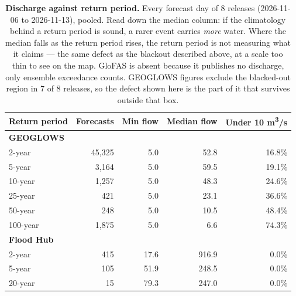 \begin{table}[htbp]
\centering
\small
\begin{tabular}{l r r r r}
\toprule
Return period & Forecasts & Min flow & Median flow & Under 10 m\textsuperscript{3}/s \\
\midrule
\multicolumn{5}{l}{\textbf{GEOGLOWS}} \\
  2-year & 45,325 & 5.0 & 52.8 & 16.8\% \\
  5-year & 3,164 & 5.0 & 59.5 & 19.1\% \\
  10-year & 1,257 & 5.0 & 48.3 & 24.6\% \\
  25-year & 421 & 5.0 & 23.1 & 36.6\% \\
  50-year & 248 & 5.0 & 10.5 & 48.4\% \\
  100-year & 1,875 & 5.0 & 6.6 & 74.3\% \\
\midrule
\multicolumn{5}{l}{\textbf{Flood Hub}} \\
  2-year & 415 & 17.6 & 916.9 & 0.0\% \\
  5-year & 105 & 51.9 & 248.5 & 0.0\% \\
  20-year & 15 & 79.3 & 247.0 & 0.0\% \\
\bottomrule
\end{tabular}
\caption[Discharge against return period]{%
  \textbf{Discharge against return period.}
  Every forecast day of 8 releases (2026-11-06 to
  2026-11-13), pooled. Read down the median column: if the climatology
  behind a return period is sound, a rarer event carries \emph{more} water.
  Where the median falls as the return period rises, the return period is not
  measuring what it claims --- the same defect as the blackout described above,
  at a scale too thin to see on the map. GloFAS is absent because it publishes
  no discharge, only ensemble exceedance counts. GEOGLOWS figures exclude the blacked-out region in 7 of 8 releases, so the defect shown here is the part of it that survives outside that box.}
\label{tab:return-period-flow}
\end{table}
